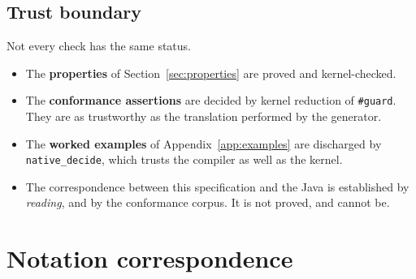 \documentclass[11pt,a4paper]{article}
\newcommand{\jv}[1]{\texttt{#1}}       %
\theoremstyle{definition}
\theoremstyle{plain}
\theoremstyle{remark}
\begin{document}
\subsection{Trust boundary}

Not every check has the same status.

\begin{itemize}[leftmargin=1.6em]
  \item The \textbf{properties} of Section~\ref{sec:properties} are proved and
    kernel-checked.
  \item The \textbf{conformance assertions} are decided by kernel reduction of
    \jv{\#guard}. They are as trustworthy as the translation performed by the
    generator.
  \item The \textbf{worked examples} of Appendix~\ref{app:examples} are
    discharged by \jv{native\_decide}, which trusts the compiler as well as the
    kernel.
  \item The correspondence between this specification and the Java is
    established by \emph{reading}, and by the conformance corpus. It is not
    proved, and cannot be.
\end{itemize}

\appendix

\section{Notation correspondence}
\end{document}
